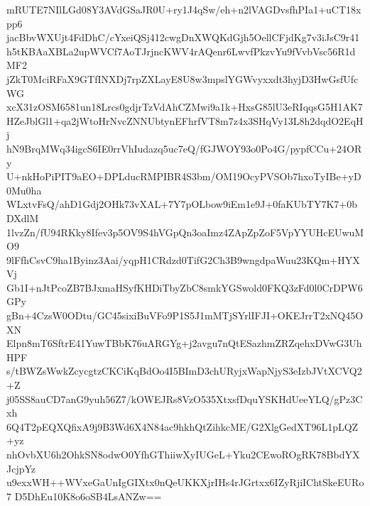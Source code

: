 mRUTE7NIlLGd08Y3AVdGSaJR0U+ry1J4qSw/eh+n2lVAGDvsfhPIa1+uCT18xpp6
jacBbvWXUjt4FdDhC/cYxeiQSj412cwgDnXWQKdGjh5OellCFjdKg7v3iJsC9r41
h5tKBAaXBLa2upWVCf7AoTJrjncKWV4rAQenr6LwvfPkzvYu9fVvbVsc56R1dMF2
jZkT0MciRFaX9GTfINXDj7rpZXLayE8U8w3mpslYGWvyxxdt3hyjD3HwGsfUfcWG
xcX31zOSM6581un18Lrcs0gdjrTzVdAhCZMwi9a1k+HxsG85lU3eRIqqsG5H1AK7
HZeJblGl1+qa2jWtoHrNvcZNNUbtynEFhrfVT8m7z4x3SHqVy13L8h2dqdO2EqHj
hN9BrqMWq34igcS6IE0rrVhIudazq5uc7eQ/fGJWOY93o0Po4G/pypfCCu+24ORy
U+nkHoPiPIT9aEO+DPLducRMPIBR4S3bm/OM19OcyPVSOb7hxoTyIBe+yD0Mu0ha
WLxtvFsQ/ahD1Gdj2OHk73vXAL+7Y7pOLbow9iEm1e9J+0faKUbTY7K7+0bDXdlM
1lvzZn/fU94RKky8Ifev3p5OV9S4hVGpQn3oaImz4ZApZpZoF5VpYYUHcEUwuMO9
9lFfhCsvC9ha1Byinz3Aai/yqpH1CRdzd0TifG2Ch3B9wngdpaWuu23KQm+HYXVj
Gb1I+nJtPcoZB7BJxmaHSyfKHDiTbyZbC8smkYGSwold0FKQ3zFd0l0CrDPW6GPy
gBn+4CzsW0ODtu/GC45sixiBuVFo9P1S5J1mMTjSYrlIFJI+OKEJrrT2xNQ45OXN
Elpn8mT6SftrE41YuwTBbK76uARGYg+j2avgu7nQtESazhmZRZqehxDVwG3UhHPF
s/tBWZsWwkZcycgtzCKCiKqBdOo4I5BImD3chURyjxWapNjyS3eIzbJVtXCVQ2+Z
j05SS8auCD7anG9yuh56Z7/kOWEJRs8VzO535XtxsfDquYSKHdUeeYLQ/gPz3Cxh
6Q4T2pEQXQfixA9j9B3Wd6X4N84ac9hkhQtZihkcME/G2XlgGedXT96L1pLQZ+yz
nhOvbXU6h2OhkSN8odwO0YfhGThiiwXyIUGeL+Yku2CEwoROgRK78BbdYXJcjpYz
u9exxWH++WVxeGaUnIgGIXtx0nQeUKKXjrIHs4rJGrtxx6IZyRjiIChtSkeEURo7
D5DhEu10K8o6oSB4LsANZw==
